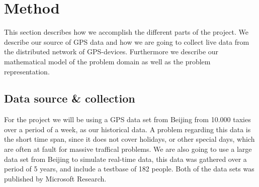 \section{Method}
This section describes how we accomplish the different parts of the project. We describe our source of GPS data and how we are going to collect live data from the distributed network of GPS-devices. Furthermore we describe our mathematical model of the problem domain as well as the problem representation.

\subsection*{Data source \& collection}
For the project we will be using a GPS data set from Beijing from 10.000 taxies over a period of a week, as our historical data\cite{Tdrive}. A problem regarding this data is the short time span, since it does not cover holidays, or other special days, which are often at fault for massive traffical problems. We are also going to use a large data set from Beijing to simulate real-time data, this data was gathered over a period of 5 years, and include a testbase of 182 people\cite{Geolife}. Both of the data sets was published by Microsoft Research.

